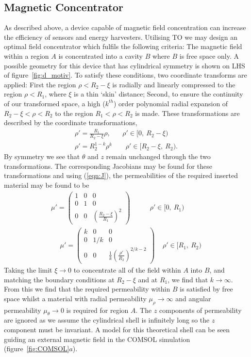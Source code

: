 \documentclass[11pt]{iopart}
\begin{document}
\subsection{Magnetic Concentrator}
As described above, a device capable of magnetic field concentration
can increase the efficiency of sensors and energy harvesters.
Utilising TO we may design an optimal field concentrator which fulfils
the following criteria: The magnetic field within a region $A$ is concentrated
into a cavity $B$ where $B$ is free space only. A possible geometry
for this device that has cylindrical symmetry is shown on LHS of
figure~\ref{fig:d_motiv}.  To satisfy these conditions, two coordinate
transforms are applied: First the region $\rho < R_2 - \xi$ is
radially and linearly compressed to the region $\rho < R_1$, where
$\xi$ is a thin `skin' distance; Second, to ensure the continuity of
our transformed space, a high ($k^{th}$) order polynomial radial
expansion of $R_2 - \xi < \rho < R_2$ to the region $R_1 < \rho < R_2$
is made. These transformations are described by the coordinate
transformations,
\begin{equation}
  \label{eqn:transform}
  \begin{split}
\rho' = \frac{R_1}{R_2-\xi}\rho,~~~~~~~~\rho'\in[0,~R_2-\xi)~~\\
\rho' = R_2^{1-k}\rho^k~~~~~~~~~\rho'\in[R_2-\xi,~R_2).
  \end{split}
\end{equation}
By symmetry we see that $\theta$ and $z$ remain unchanged through the
two transformations. The corresponding Jacobians may be found for
these transformations and using (\ref{eqn:J}), the
permeabilities of the required inserted material may be found to be
\begin{equation}
  \label{eqn:mat}
  \begin{split}
 \mu' = \begin{pmatrix}1&0&0\\0&1&0\\0&0&(\frac{R_2-\xi}{R_1})^2\end{pmatrix}~~~~~~~~~~~~~\rho'\in[0,~R_1)~~\\
~~~~~~\mu' = \begin{pmatrix}k&0&0\\0&1/k&0\\0&0&\frac{1}{k}(\frac{\rho'}{R_2})^{2/k-2}\end{pmatrix}~~~~~\rho'\in[R_1,~R_2)
  \end{split}
\end{equation}
Taking the limit $\xi \rightarrow 0$ to concentrate all of
the field within $A$ into $B$, and matching the boundary conditions at
$R_2-\xi$ and at $R_1$, we find that $k \rightarrow \infty$. From this
we find that the required permeability within $B$ is satisfied by free
space whilst a material with radial permeability $\mu_\rho \rightarrow
\infty$ and angular permeability $\mu_\theta \rightarrow 0$ is
required for region $A$. The $z$ components of permeability are ignored
as we assume the cylindrical shell is
infinitely long so the $z$ component must be invariant. A model for
this theoretical shell can be seen guiding an external magnetic field
in the COMSOL simulation (figure~\ref{fig:COMSOL}$a$).
\end{document}
